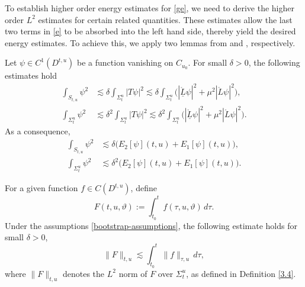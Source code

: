 \documentclass[11pt,twoside]{article}
\begin{document}
To establish higher order energy estimates for \eqref{ge}, we need to derive the higher order $L^2$ estimates for
certain related quantities.
These estimates allow the last two terms in \eqref{e} to be absorbed into the left hand side, thereby yield the desired energy estimates.
To achieve this, we apply two lemmas from \cite[Lemma 7.3]{M-Y} and \cite[Lemma 12.57]{Sp}, respectively.


\begin{lemma}\label{L2T}
Let $\psi \in C^1(D^{t, u})$ be a function vanishing on $C_{u_0}$. For small $\delta > 0$, the following estimates hold
\begin{align}
\int_{S_{t, u}} \psi^2 &\lesssim \delta \int_{\Sigma_t^u} |T\psi|^2 \lesssim \delta \int_{\Sigma_{t}^{u}}
\big(|\mathring{\underline{L}}\psi|^2 + \mu^2 |\mathring{L}\psi|^2\big), \label{SSi} \\
\int_{\Sigma_{t}^{u}} \psi^2 &\lesssim \delta^2 \int_{\Sigma_t^u} |T\psi|^2 \lesssim \delta^2 \int_{\Sigma_{t}^{u}} \big( |\mathring{\underline{L}}\psi|^2 + \mu^2 |\mathring{L}\psi|^2 \big). \label{SiSi}
\end{align}
As a consequence,
 \begin{align}
 \int_{S_{t, u}} \psi^2 &\lesssim \delta \big( E_2[\psi](t, u) + E_1[\psi](t, u) \big), \label{SE} \\
 \int_{\Sigma_{t}^{u}} \psi^2 &\lesssim \delta^2 \big( E_2[\psi](t, u) + E_1[\psi](t, u) \big). \label{SiE}
 \end{align}
\end{lemma}
\begin{lemma}\label{L2L}
 For a given function $f \in C(D^{t, u})$, define
 \[
 F(t,u,\vartheta) := \int_{t_0}^t f(\tau,u,\vartheta) \, d\tau.
 \]
 Under the assumptions \eqref{bootstrap-assumptions}, the following estimate holds for small $\delta > 0$,
 \begin{equation}\label{Ff}
 \|F\|_{t,u} \lesssim \int_{t_0}^t \|f\|_{\tau,u} \, d\tau,
 \end{equation}
 where $\|F\|_{t,u}$ denotes the $L^2$ norm of $F$ over $\Sigma_t^u$, as defined in Definition \ref{3.4}.
\end{lemma}
\end{document}
